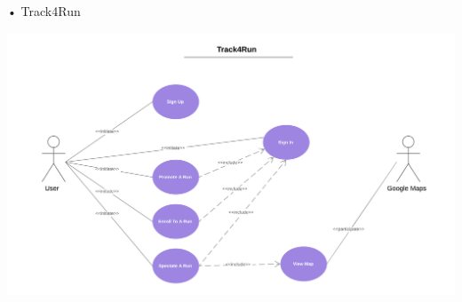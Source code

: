 \begin{enumerate}
\begin{minipage}{\textwidth}
\item[•]{\Large Track4Run}
\FloatBarrier
\begin{center}
\includegraphics[scale=0.5]{Images/Track4RunCaseDiagram.png}
\end{center}
\FloatBarrier
\end{minipage}
\end{enumerate}

